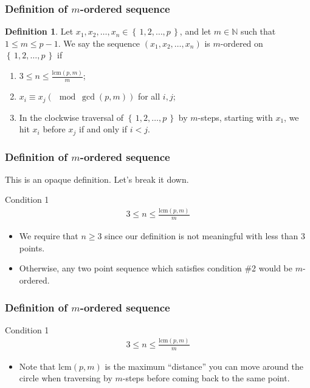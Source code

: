 \documentclass{beamer}
\theoremstyle{plain}
\theoremstyle{definition}
\newtheorem{Def}[theorem]{Definition}
\theoremstyle{remark}
\newcommand{\n}{\mathbb{N}}				%
\newcommand{\bee}{\begin{equation}\begin{aligned}}
\newcommand{\eee}{\end{aligned}\end{equation}}
\newcommand{\fracc}{\frac}				%
\renewcommand{\leq}{\leqslant}			%
\renewcommand{\geq}{\geqslant}			%
\renewcommand{\'}{\hspace{0.5mm}'}		%
\renewcommand{\Set}[1]{\left\{\,#1\,\right\}}	%
\begin{document}

\begin{frame}
\frametitle{Definition of $m$-ordered sequence}
	\begin{Def}
	Let $x_1,x_2,\hdots, x_n \in \Set{1,2,\hdots, p}$, 
	and let $m \in \n$
	such that $1 \leq m \leq p - 1$. We say the 
	sequence $(x_1,x_2,\hdots, x_n)$ is $m$-ordered
	on $\Set{1,2,\hdots, p}$ if 
	\begin{enumerate}
		\item $3 \leq n \leq \fracc{\mathrm{lcm}(p,m)}{m}$;
		\item $x_i \equiv x_j (\mod \gcd(p,m))$ for all
		$i,j$;
		\item In the clockwise traversal of 
		$\Set{1,2,\hdots, p}$ by
		$m$-steps, starting with $x_1$, we hit $x_i$ before
		$x_j$ if and only if $i < j$. 
	\end{enumerate}
	\end{Def}	

\end{frame}


\begin{frame}
\frametitle{Definition of $m$-ordered sequence}
	This is an opaque definition. Let's break it down. 
	\begin{block}{Condition 1}
		\bee
			3 \leq n \leq \fracc{\mathrm{lcm}(p,m)}{m}
		\eee
	\end{block}
	\begin{itemize}
		\item We require that $n \geq 3$ since our 
		definition is not 
		meaningful with less than $3$ points. 
		\item Otherwise, any two point sequence which satisfies 
		condition \#2 would be $m$-ordered. 
	\end{itemize}
	

\end{frame}


\begin{frame}
\frametitle{Definition of $m$-ordered sequence}
	\begin{block}{Condition 1}
		\bee
			3 \leq n \leq \fracc{\mathrm{lcm}(p,m)}{m}
		\eee
	\end{block}
	\begin{itemize}
		\item Note that $\mathrm{lcm}(p,m)$ is the 
		maximum ``distance'' you can move around the 
		circle when traversing by $m$-steps before
		coming back to the same point. 
	\end{itemize}
	

\end{frame}
\end{document}
